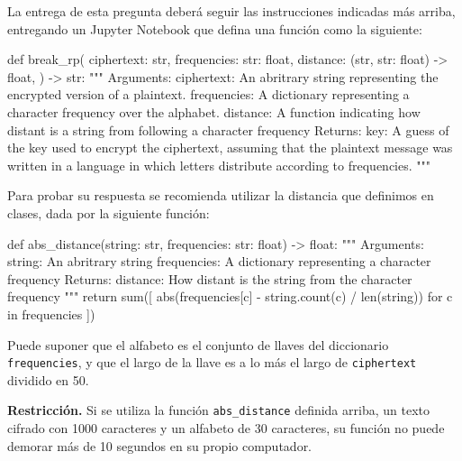 La entrega de esta pregunta deberá seguir las instrucciones indicadas más arriba, entregando un Jupyter Notebook que defina una función como la siguiente:

\bigskip
\begin{python}
  def break_rp(
      ciphertext: str,
      frequencies: {str: float},
      distance: (str, {str: float}) -> float,
    ) -> str:
    """
    Arguments:
      ciphertext: An abritrary string representing the
                  encrypted version of a plaintext.
      frequencies: A dictionary representing a character
                   frequency over the alphabet.
      distance: A function indicating how distant is a string
                from following a character frequency
    Returns:
      key: A guess of the key used to encrypt the ciphertext, assuming
           that the plaintext message was written in a language in which
           letters distribute according to frequencies.
    """
\end{python}

Para probar su respuesta se recomienda utilizar la distancia que definimos en clases, dada por la siguiente función:

\bigskip
\begin{python}
  def abs_distance(string: str, frequencies: {str: float}) -> float:
    """
    Arguments:
      string: An abritrary string
      frequencies: A dictionary representing a character frequency
    Returns:
      distance: How distant is the string from the character frequency
    """
    return sum([
      abs(frequencies[c] - string.count(c) / len(string))
      for c in frequencies
    ])
\end{python}
Puede suponer que el alfabeto es el conjunto de llaves del diccionario \texttt{frequencies}, y que el largo de la llave es a lo más el largo de \texttt{ciphertext} dividido en 50.

\textbf{Restricción.} Si se utiliza la función \texttt{abs\_distance} definida arriba, un texto cifrado con 1000 caracteres y un alfabeto de 30 caracteres, su función no puede demorar más de 10 segundos en su propio computador.
